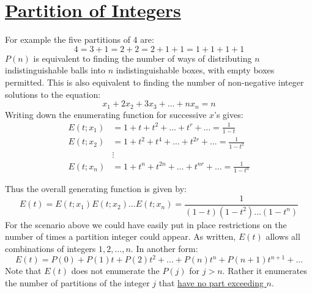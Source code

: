 \documentclass[12pt, letterpaper, onecolumn, conference, final]{IEEEtran}
\theoremstyle{definition}
\newtheorem{definition}{Definition}[section]
\theoremstyle{plain}
\begin{document}
\vspace{.3cm}
\section{\textbf{\underline{Partition of Integers}}}
\vspace{.3cm}
\begin{center}
\end{center}

\noindent
For example the five partitions of 4 are:
\begin{equation*}
4 = 3 + 1 = 2 + 2 = 2 + 1 + 1 = 1 + 1 + 1 + 1
\end{equation*}
$P(n)$  is equivalent to finding the number of ways of distributing $n$ indistinguishable balls into $n$ indistinguishable boxes, with empty boxes permitted. This is also equivalent to finding the number of non-negative integer solutions to the equation:
\begin{equation*}
x_1 + 2x_2 + 3x_3 + \dots + nx_n = n
\end{equation*}
Writing down the enumerating function for successive $x$'s gives:
\begin{equation*}
\begin{split}
E(t;x_1) &= 1 + t + t^2 + \dots + t^r + \dots = \frac{1}{1-t} \\
E(t;x_2) &= 1 + t^2 + t^4 + \dots + t^{2r} + \dots = \frac{1}{1-t^2} \\
&\vdots \\
E(t;x_n) &= 1 + t^n + t^{2n} + \dots + t^{nr} + \dots = \frac{1}{1-t^n} 
\end{split}
\end{equation*}

\newpage
\noindent
Thus the overall generating function is given by:
\begin{equation*}
E(t) = E(t;x_1)E(t;x_2)\dots E(t;x_n) = \frac{1}{(1-t)(1-t^2)\dots(1-t^n)}
\end{equation*}
For the scenario above we could have easily put in place restrictions on the number of times a partition integer could appear. As written, $E(t)$ allows all combinations of integers $1,2,\dots,n$. In another form:
\begin{equation*}
E(t) = P(0) + P(1)t + P(2)t^2 + \dots + P(n)t^n + P(n+1)t^{n+1} + \dots
\end{equation*}
Note that $E(t)$ does not enumerate the $P(j)$ for $j>n$. Rather it enumerates the number of partitions of the integer $j$ that \underline{have no part exceeding $n$}.
\end{document}
